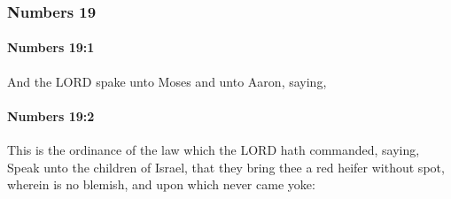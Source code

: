 	\subsubsection{Numbers 19} %
		\label{NUMBERS-19}

		\paragraph{Numbers 19:1} %
			\label{NUMBERS-19-1}

			And the LORD spake unto Moses and unto Aaron, saying,


		\paragraph{Numbers 19:2} %
			\label{NUMBERS-19-2}

			This is the ordinance of the law which the LORD hath commanded, saying, Speak unto the children of Israel, that they bring thee a red heifer without spot, wherein is no blemish, and upon which never came yoke:

